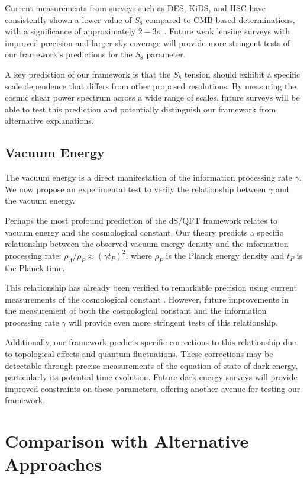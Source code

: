 \documentclass[11pt,english,twoside]{article}
\theoremstyle{plain}
\theoremstyle{definition}
\theoremstyle{remark}
\newcommand{\gammaR}{\gamma}
\begin{document}
Current measurements from surveys such as DES, KiDS, and HSC have consistently shown a lower value of $S_8$ compared to CMB-based determinations, with a significance of approximately $2-3\sigma$ \cite{Weiner2025}. Future weak lensing surveys with improved precision and larger sky coverage will provide more stringent tests of our framework's predictions for the $S_8$ parameter.

A key prediction of our framework is that the $S_8$ tension should exhibit a specific scale dependence that differs from other proposed resolutions. By measuring the cosmic shear power spectrum across a wide range of scales, future surveys will be able to test this prediction and potentially distinguish our framework from alternative explanations.

\subsection{Vacuum Energy}
\label{subsec:vacuum_energy_test}

The vacuum energy is a direct manifestation of the information processing rate $\gammaR$. We now propose an experimental test to verify the relationship between $\gammaR$ and the vacuum energy.

Perhaps the most profound prediction of the dS/QFT framework relates to vacuum energy and the cosmological constant. Our theory predicts a specific relationship between the observed vacuum energy density and the information processing rate: $\rho_\Lambda/\rho_P \approx (\gammaR t_P)^2$, where $\rho_P$ is the Planck energy density and $t_P$ is the Planck time.

This relationship has already been verified to remarkable precision using current measurements of the cosmological constant \cite{Weiner2024a}. However, future improvements in the measurement of both the cosmological constant and the information processing rate $\gammaR$ will provide even more stringent tests of this relationship.

Additionally, our framework predicts specific corrections to this relationship due to topological effects and quantum fluctuations. These corrections may be detectable through precise measurements of the equation of state of dark energy, particularly its potential time evolution. Future dark energy surveys will provide improved constraints on these parameters, offering another avenue for testing our framework.

\section{Comparison with Alternative Approaches}
\label{sec:comparison}
\end{document}
